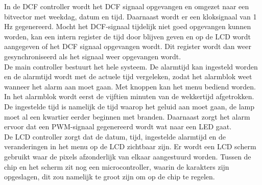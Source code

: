 \noindent In de DCF controller wordt het DCF signaal opgevangen en omgezet naar een bitvector met weekdag, datum en tijd. Daarnaast wordt er een kloksignaal van 1 Hz gegenereerd. Mocht het DCF-signaal tijdelijk niet goed opgevangen kunnen worden, kan een intern register de tijd door blijven geven en op de LCD wordt aangegeven of het DCF signaal opgevangen wordt. Dit register wordt dan weer gesynchroniseerd als het signaal weer opgevangen wordt.\\
De main controller bestuurt het hele systeem. De alarmtijd kan ingesteld worden en de alarmtijd wordt met de actuele tijd vergeleken, zodat het alarmblok weet wanneer het alarm aan moet gaan. Met knoppen kan het menu bediend worden.\\
In het alarmblok wordt eerst de vijftien minuten van de wekkertijd afgetrokken. De ingestelde tijd is namelijk de tijd waarop het geluid aan moet gaan, de lamp moet al een kwartier eerder beginnen met branden. Daarnaast zorgt het alarm ervoor dat een PWM-signaal gegenereerd wordt wat naar een LED gaat. \\
De LCD controller zorgt dat de datum, tijd, ingestelde alarmtijd en de veranderingen in het menu op de LCD zichtbaar zijn. Er wordt een LCD scherm gebruikt waar de pixels afzonderlijk van elkaar aangestuurd worden. Tussen de chip en het scherm zit nog een microcontroller, waarin de karakters zijn opgeslagen, dit zou namelijk te groot zijn om op de chip te regelen.
